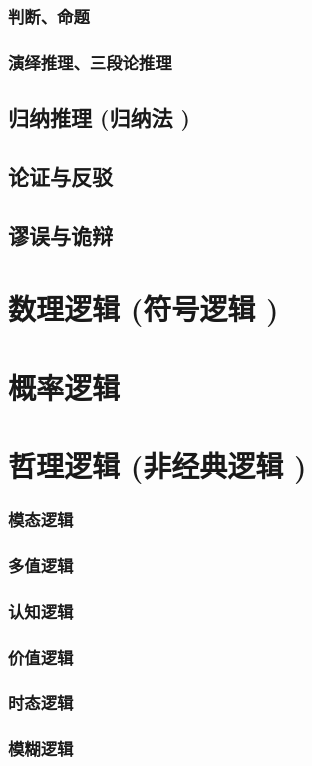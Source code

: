\documentclass[UTF8]{../RepresentationUniverse}
\begin{document}
        \subsubsection{判断、命题}
        \subsubsection{演绎推理、三段论推理}
    \subsection{归纳推理 (归纳法 )}
    \subsection{论证与反驳}
    \subsection{谬误与诡辩}
\section{数理逻辑 (符号逻辑 )}
\section{概率逻辑}
\section{哲理逻辑 (非经典逻辑 )}
    \subsubsection{模态逻辑}
    \subsubsection{多值逻辑}
    \subsubsection{认知逻辑}
    \subsubsection{价值逻辑}
    \subsubsection{时态逻辑}
    \subsubsection{模糊逻辑}
\end{document}
